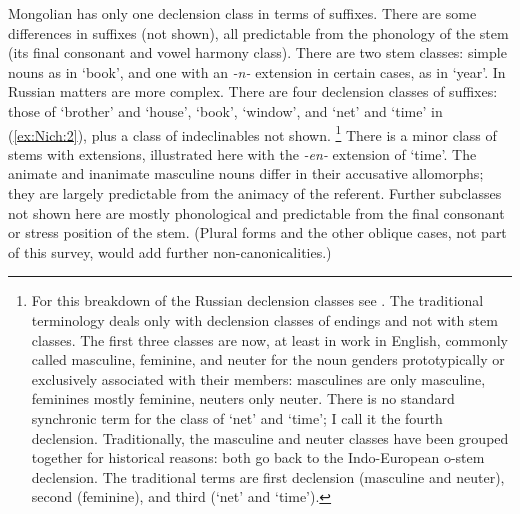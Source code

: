 \documentclass[output=collectionpaper]{langsci/langscibook}
\begin{document}
Mongolian has only one declension class in terms of suffixes. There are some differences in suffixes (not shown), all predictable from the phonology of the stem (its final consonant and vowel harmony class). There are two stem classes: simple nouns as in `book', and one with an \textit{-n-} extension in certain cases, as in `year'. In Russian matters are more complex. There are four declension classes of suffixes: those of `brother' and `house', `book', `window', and `net' and `time' in (\ref{ex:Nich:2}), plus a class of indeclinables not shown.%
\footnote{%
For this breakdown of the Russian declension classes see \citet{Corbett1982}. The traditional terminology deals only with declension classes of endings and not with stem classes. The first three classes are now, at least in work in English, commonly called masculine, feminine, and neuter for the noun genders prototypically or exclusively associated with their members: masculines are only masculine, feminines mostly feminine, neuters only neuter. There is no standard synchronic term for the class of `net' and `time'; I call it the fourth declension. Traditionally, the masculine and neuter classes have been grouped together for historical reasons: both go back to the Indo-European o-stem declension. The traditional terms are first declension (masculine and neuter), second (feminine), and third (`net' and `time').
} %
There is a minor class of stems with extensions, illustrated here with the \textit{-en-} extension of `time'. The animate and inanimate masculine nouns differ in their accusative allomorphs; they are largely predictable from the animacy of the referent. Further subclasses not shown here are mostly phonological and predictable from the final consonant or stress position of the stem. (Plural forms and the other oblique cases, not part of this survey, would add further non-canonicalities.)
\end{document}
